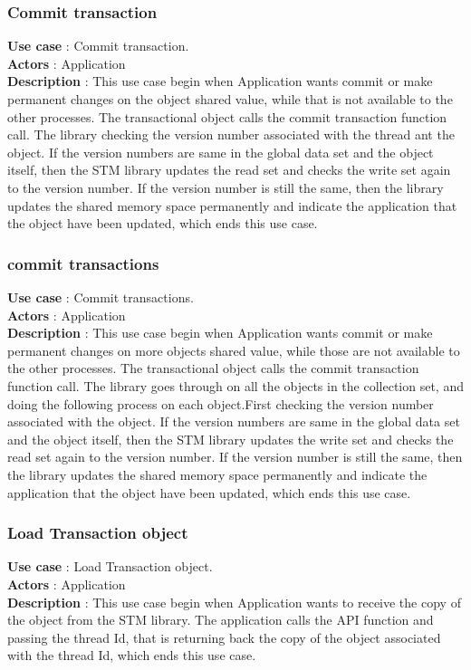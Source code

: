 \documentclass[12pt]{article}
\begin{document}
{\subsubsection{Commit transaction}
\textbf{Use case} : Commit transaction.\\
\textbf{Actors} : Application\\
\textbf{Description} : This use case begin when Application wants commit or make permanent changes on the object shared value, while that is not available to the other processes. The transactional object calls the commit transaction function call. The library checking the version number associated with the thread ant the object. If the version numbers are same in the global data set and the object itself, then the STM library updates the read set and checks the write set again to the version number. If the version number is still the same, then the library updates the shared memory space permanently and indicate the application that the object have been updated, which ends this use case.\\ 
\subsubsection{commit transactions}
\textbf{Use case} : Commit transactions.\\
\textbf{Actors} : Application\\
\textbf{Description} : This use case begin when Application wants commit or make permanent changes on more objects shared value, while those are not available to the other processes. The transactional object calls the commit transaction function call. The library goes through on all the objects in the collection set, and doing the following process on each object.First checking the version number associated with the object. If the version numbers are same in the global data set and the object itself, then the STM library updates the write set and checks the read set again to the version number. If the version number is still the same, then the library updates the shared memory space permanently and indicate the application that the object have been updated,  which ends this use case.\\
\subsubsection{Load Transaction object}
\textbf{Use case} : Load Transaction object.\\
\textbf{Actors} : Application\\
\textbf{Description} : This use case begin when Application wants to receive the copy of the object from the STM library. The application calls the API function and passing the thread Id, that is returning back the copy of the object associated with the thread Id, which ends this use case.\\
}
\end{document}
